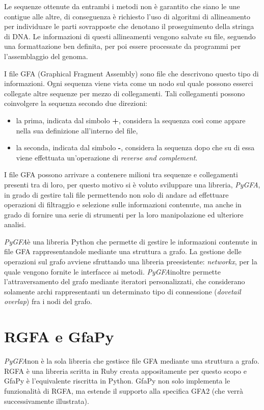 \documentclass[11pt, a4paper]{book}
\newcommand {\pygfa} {\textit{PyGFA}}
\begin{document}
Le sequenze ottenute da entrambi i metodi non è garantito
che siano le une contigue alle altre, di conseguenza è richiesto
l'uso di algoritmi di allineamento per individuare le parti sovrapposte
che denotano il proseguimento della stringa di DNA. Le informazioni
di questi allineamenti vengono salvate su file, seguendo una formattazione
ben definita, per poi essere processate
da programmi per l'assemblaggio del genoma.


I file GFA\cite{gfa_spec} (Graphical Fragment Assembly) sono file che descrivono	
questo tipo di informazioni. Ogni sequenza
viene vista come un nodo sul quale possono esserci collegate altre
sequenze per mezzo di collegamenti. Tali collegamenti possono
coinvolgere la sequenza secondo due direzioni:
\begin{itemize}
	\item la prima, indicata dal simbolo \textbf{+}, considera la
	sequenza così come appare nella sua definizione all'interno del file,
	\item la seconda, indicata dal simbolo \textbf{-}, considera la
	sequenza dopo che su di essa viene effettuata un'operazione di
	\emph{reverse and complement}.
\end{itemize}

I file GFA possono arrivare a contenere milioni tra sequenze e collegamenti
presenti tra di loro, per questo motivo si è voluto sviluppare una libreria, \pygfa,
in grado di gestire tali file permettendo non solo di andare ad effettuare
operazioni di filtraggio e selezione sulle informazioni contenute, ma
anche in grado di fornire una serie di strumenti per la loro
manipolazione ed ulteriore analisi.

\pygfa è una libreria Python che permette di gestire le informazioni
contenute in file GFA rappresentandole mediante una struttura a grafo.
La gestione delle operazioni sul grafo avviene sfruttando una libreria
preesistente: \emph{networkx}\cite{networkx}, per la quale vengono
fornite le interfacce ai metodi. \pygfa inoltre permette l'attraversamento del grafo mediante iteratori
personalizzati, che considerano solamente archi rappresentanti un
determinato tipo di connessione (\emph{dovetail overlap}) fra i nodi del
grafo.

\section{RGFA e GfaPy}
\pygfa non è la sola libreria che gestisce file GFA mediante una struttura a grafo.
RGFA è una libreria scritta in Ruby creata appositamente per questo scopo e GfaPy
è l'equivalente riscritta in Python. GfaPy non solo implementa le funzionalità di RGFA,
ma estende il supporto alla specifica GFA2 (che verrà successivamente illustrata).
\end{document}
